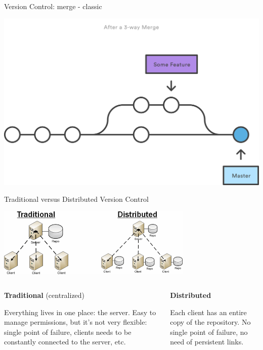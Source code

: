 \begin{frame}[fragile]{Version Control: merge - classic}

\begin{center}
\includegraphics[width=\textwidth]{git-merge-nff2}
\end{center}

\end{frame}


\begin{frame}[fragile]{Traditional versus Distributed Version Control}

\begin{center}
\includegraphics[width=0.7\textwidth]{vc-centralized-distributed}
\end{center}

\begin{columns}
\begin{column}{0.5\textwidth}
   \textbf{Traditional} (centralized)

   Everything lives in one place: the server. Easy to manage permissions,
     but it's not very flexible: single point of failure, clients needs to be
     constantly connected to the server, etc.
\end{column}
\begin{column}{0.5\textwidth}
  \textbf{Distributed}

  Each client has an entire copy of the repository. No single point of failure,
  no need of persistent links.
\end{column}
\end{columns}

\end{frame}





